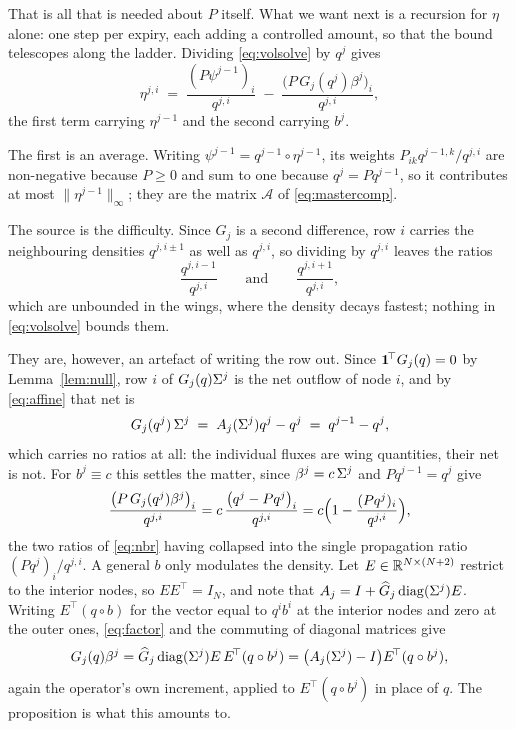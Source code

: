 That is all that is needed about $P$ itself. What we want next is a recursion for
$\eta$ alone: one step per expiry, each adding a controlled amount, so that the
bound telescopes along the ladder. Dividing \eqref{eq:volsolve} by $q^j$ gives
\begin{equation}\label{eq:divided}
  \eta^{j,i}\;=\;\frac{(P\psi^{j-1})_i}{q^{j,i}}
   \;-\;\frac{\bigl(P\,G_j(q^j)\beta^j\bigr)_i}{q^{j,i}} ,
\end{equation}
the first term carrying $\eta^{j-1}$ and the second carrying $b^j$.

The first is an average. Writing $\psi^{j-1}=q^{j-1}\!\circ\eta^{j-1}$, its weights
$P_{ik}q^{j-1,k}/q^{j,i}$ are non-negative because $P\ge0$ and sum to one because
$q^j=Pq^{j-1}$, so it contributes at most $\lVert\eta^{j-1}\rVert_\infty$; they are
the matrix $\mathcal A$ of \eqref{eq:mastercomp}.

The source is the difficulty. Since $G_j$ is a second difference, row $i$ carries
the neighbouring densities $q^{j,i\pm1}$ as well as $q^{j,i}$, so dividing by $q^{j,i}$
leaves the ratios
\begin{equation}\label{eq:nbr}
  \frac{q^{j,i-1}}{q^{j,i}}
  \qquad\text{and}\qquad
  \frac{q^{j,i+1}}{q^{j,i}} ,
\end{equation}
which are unbounded in the wings, where the density decays fastest; nothing in
\eqref{eq:volsolve} bounds them.

They are, however, an artefact of writing the row out. Since
$\mathbf 1^{\!\top}G_j(q)=0$ by Lemma~\ref{lem:null}, row $i$ of $G_j(q)\Sigma^j$ is the
net outflow of node $i$, and by \eqref{eq:affine} that net is
\begin{equation}\label{eq:netknown}
  G_j(q^j)\,\Sigma^j\;=\;A_j(\Sigma^j)q^j-q^j\;=\;q^{j-1}-q^{j},
\end{equation}
which carries no ratios at all: the individual fluxes are wing quantities, their
net is not. For $b^j\equiv c$ this settles the matter, since $\beta^j=c\,\Sigma^j$
and $Pq^{j-1}=q^j$ give
\[
  \frac{\bigl(P\,G_j(q^j)\beta^j\bigr)_i}{q^{j,i}}
  =c\,\frac{\bigl(q^{j}-Pq^{j}\bigr)_i}{q^{j,i}}
  =c\Bigl(1-\frac{(Pq^{j})_i}{q^{j,i}}\Bigr),
\]
the two ratios of \eqref{eq:nbr} having collapsed into the single propagation
ratio $(Pq^j)_i/q^{j,i}$. A general $b$ only modulates the density. Let
$E\in\mathbb R^{N\times(N+2)}$ restrict to the interior nodes, so $EE^{\!\top}=I_N$, and
note that $A_j=I+\widehat G_j\,\mathrm{diag}(\Sigma^j)E$. Writing
$E^{\!\top}(q\circ b)$ for the vector equal to $q^ib^i$ at the interior nodes and
zero at the outer ones, \eqref{eq:factor} and the commuting of diagonal matrices
give
\begin{equation}\label{eq:modulated}
  G_j(q)\beta^j
  =\widehat G_j\,\mathrm{diag}(\Sigma^j)E\,E^{\!\top}(q\circ b^j)
  =\bigl(A_j(\Sigma^j)-I\bigr)E^{\!\top}(q\circ b^j),
\end{equation}
again the operator's own increment, applied to $E^{\!\top}(q\circ b^j)$ in place of
$q$. The proposition is what this amounts to.

